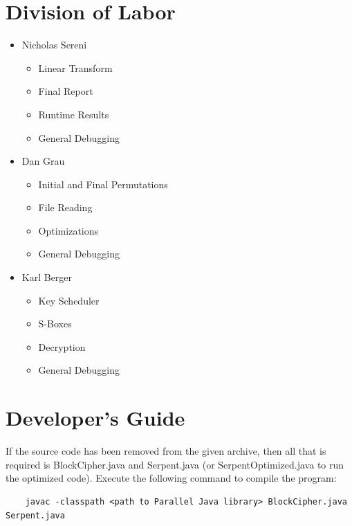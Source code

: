 \documentclass[12pt]{article} %
\begin{document}
\section{Division of Labor}
\begin{itemize}
 \item Nicholas Sereni
 \begin{itemize}
  \item{Linear Transform}
  \item{Final Report}
  \item{Runtime Results}
  \item{General Debugging}
 \end{itemize}
 \item{Dan Grau}
 \begin{itemize}
  \item{Initial and Final Permutations}
  \item{File Reading}
  \item{Optimizations}
  \item{General Debugging}
 \end{itemize}
 \item{Karl Berger}
 \begin{itemize}
  \item{Key Scheduler}
  \item{S-Boxes}
  \item{Decryption}
  \item{General Debugging}
 \end{itemize}
\end{itemize}

\section{Developer's Guide}
  If the source code has been removed from the given archive, then all that is required is BlockCipher.java and Serpent.java (or SerpentOptimized.java to run the optimized code).  Execute the following command to compile the program:
  \begin{verbatim}
  	javac -classpath <path to Parallel Java library> BlockCipher.java Serpent.java
  \end{verbatim}
  
\end{document}
